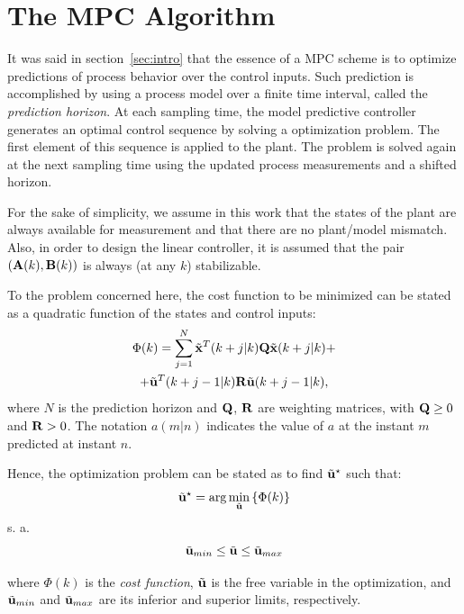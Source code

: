 \documentclass[conference]{IEEEtran} %
\begin{document}
\section{The MPC Algorithm}
\label{sec:mpc}

It was said in section~\ref{sec:intro} that the essence of a MPC scheme is to optimize predictions of process behavior over the control inputs. Such prediction is accomplished by using a process model over a finite time interval, called the {\em prediction horizon}. At each sampling time, the model predictive controller generates an optimal control sequence by solving a optimization problem. The first element of this sequence is applied to the plant. The problem is solved again at the next sampling time using the updated process measurements and a shifted horizon.

For the sake of simplicity, we assume in this work that the states of the plant are always available for measurement and that there are no plant/model mismatch. Also, in order to design the linear controller, it is assumed that the pair $({\bf A}(k),{\bf B}(k))$ is always (at any $k$) stabilizable.

To the problem concerned here, the cost function to be minimized can be stated as a quadratic function of the states and control inputs:
\begin{multline}\label{eqn:cost}
	\Phi(k) = \sum_{j=1}^{N}\tilde{\bf x}^T(k+j|k){\bf Q}\tilde{\bf x}(k+j|k) + \\ + \tilde{\bf u}^T(k+j-1|k){\bf R}\tilde{\bf u}(k+j-1|k),
\end{multline}
\noindent where $N$ is the prediction horizon and ${\bf Q}$, ${\bf R}$ are weighting matrices, with ${\bf Q}\geq 0$ and ${\bf R}>0$. The notation $a(m|n)$ indicates the value of $a$ at the instant $m$ predicted at instant $n$.

Hence, the optimization problem can be stated as to find $\tilde{\bf u}^\star$ such that:
\begin{equation*}
	\tilde{\bf u}^\star = \arg\min_{\tilde{\bf u}}\left\{\Phi(k)\right\}
\end{equation*}
\noindent s. a.
\begin{equation*}
	\tilde{\bf u}_{min} \leq \tilde{\bf u} \leq \tilde{\bf u}_{max}
\end{equation*}

\noindent where $\Phi(k)$ is the {\em cost function}, $\tilde{\bf u}$ is the
free variable in the optimization, and $\tilde{\bf u}_{min}$ and
$\tilde{\bf u}_{max}$ are its inferior and superior limits, respectively.
\end{document}
